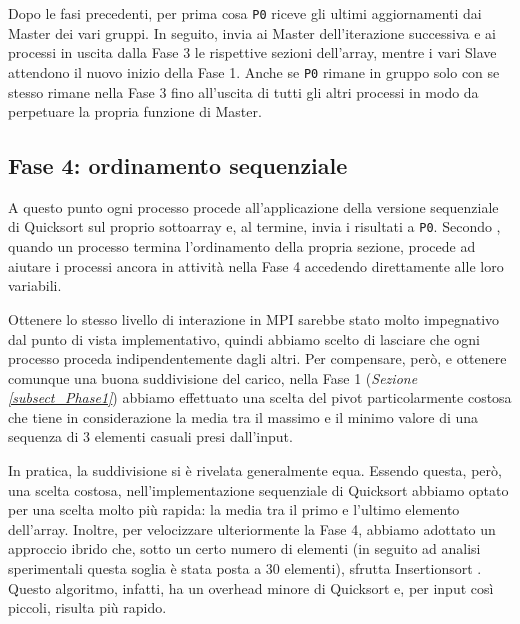 Dopo le fasi precedenti, per prima cosa  \texttt{P0} riceve gli ultimi aggiornamenti dai Master dei vari gruppi. In seguito, invia ai Master dell'iterazione successiva e ai processi in uscita dalla Fase 3 le rispettive sezioni dell'array, mentre i vari Slave attendono il nuovo inizio della Fase 1.
Anche se  \texttt{P0} rimane in gruppo solo con se stesso rimane nella Fase 3 fino all'uscita di tutti gli altri processi in modo da perpetuare la propria funzione di Master.


\subsection{Fase 4: ordinamento sequenziale} \label{subsect_Phase4}
A questo punto ogni processo procede all'applicazione della versione sequenziale di Quicksort sul proprio sottoarray e, al termine, invia i risultati a  \texttt{P0}.
Secondo \cite{PaperQuickSort}, quando un processo termina l'ordinamento della propria sezione, procede ad aiutare i processi ancora in attività nella Fase 4 accedendo direttamente alle loro variabili. 

Ottenere lo stesso livello di interazione in MPI sarebbe stato molto impegnativo dal punto di vista implementativo, quindi abbiamo scelto di lasciare che ogni processo proceda indipendentemente dagli altri. Per compensare, però, e ottenere comunque una buona suddivisione del carico, nella Fase 1 (\textit{Sezione \ref{subsect_Phase1}}) abbiamo effettuato una scelta del pivot particolarmente costosa che tiene in considerazione la media tra il massimo e il minimo valore di una sequenza di 3 elementi casuali presi dall'input.

In pratica, la suddivisione si è rivelata generalmente equa. Essendo questa, però, una scelta costosa, nell'implementazione sequenziale di Quicksort abbiamo optato per una scelta molto più rapida: la media tra il primo e l'ultimo elemento dell'array. Inoltre, per velocizzare ulteriormente la Fase 4, abbiamo adottato un approccio ibrido che, sotto un certo numero di elementi (in seguito ad analisi sperimentali questa soglia è stata posta a 30 elementi),  sfrutta Insertionsort . Questo algoritmo, infatti, ha un overhead minore di Quicksort e, per input così piccoli, risulta più rapido.

